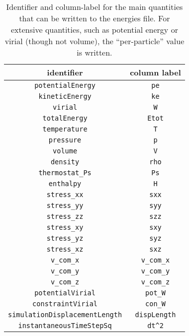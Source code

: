 \documentclass[a4paper]{article}
\begin{document}
\begin{table}
  \caption{\label{energyQuantities}Identifier and column-label for the main
    quantities that can be written to the energies file. For extensive 
    quantities, such as potential energy or virial (though not volume), the 
    ``per-particle'' value is written.}
  \begin{center}
    \begin{threeparttable}
      \begin{tabular}{|c|c|}
        \hline
        identifier & column label \\
        \hline
        \verb|potentialEnergy| & \verb|pe| \\
        \verb|kineticEnergy| & \verb|ke| \\
        \verb|virial| & \verb|W| \\
        \verb|totalEnergy| & \verb|Etot| \\
        \verb|temperature| & \verb|T| \\
        \verb|pressure| & \verb|p| \\
        \verb|volume| & \verb|V| \\
        \verb|density| \tnote{(a)}& \verb|rho| \\ 
        \verb|thermostat_Ps| \tnote{(b)} & \verb|Ps| \\
        \verb|enthalpy| & \verb|H| \\
        \verb|stress_xx|\tnote{(c)} & \verb|sxx| \\
        \verb|stress_yy| & \verb|syy| \\
        \verb|stress_zz| & \verb|szz| \\
        \verb|stress_xy| & \verb|sxy| \\
        \verb|stress_yz| & \verb|syz| \\
        \verb|stress_xz| & \verb|sxz| \\
        \verb|v_com_x| & \verb|v_com_x| \\
        \verb|v_com_y| & \verb|v_com_y| \\
        \verb|v_com_z| & \verb|v_com_z| \\
        \verb|potentialVirial| \tnote{(d)} & \verb|pot_W| \\
        \verb|constraintVirial| \tnote{(d)}  & \verb|con_W| \\
        \verb|simulationDisplacementLength| \tnote{(e)} & \verb|dispLength| \\
        \verb|instantaneousTimeStepSq| \tnote{(e)}  & \verb|dt^2| \\

\end{tabular}
\end{threeparttable}
\end{center}
\end{table}
\end{document}
